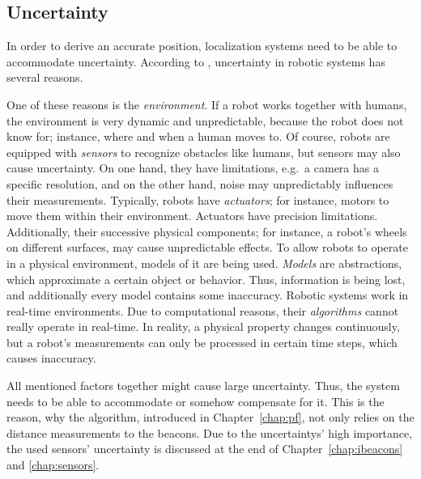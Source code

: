 \subsection{Uncertainty}
In order to derive an accurate position, localization systems need to be able to accommodate uncertainty. According to \citet{thrun:prob_robo}, uncertainty in robotic systems has several reasons.

One of these reasons is the \emph{environment}. If a robot works together with humans, the environment is very dynamic and unpredictable, because the robot does not know for; instance, where and when a human moves to.
Of course, robots are equipped with \emph{sensors} to recognize obstacles like humans, but sensors may also cause uncertainty. On one hand, they have limitations, e.g.\ a camera has a specific resolution, and on the other hand, noise may unpredictably influences their measurements. 
Typically, robots have \emph{actuators}; for instance, motors to move them within their environment. Actuators have precision limitations. Additionally, their successive physical components; for instance, a robot's wheels on different surfaces, may cause unpredictable effects.
To allow robots to operate in a physical environment, models of it are being used. \emph{Models} are abstractions, which approximate a certain object or behavior. Thus, information is being lost, and additionally every model contains some inaccuracy. Robotic systems work in real-time environments. Due to computational reasons, their \emph{algorithms} cannot really operate in real-time. In reality, a physical property changes continuously, but a robot's measurements can only be processed in certain time steps, which causes inaccuracy. 

All mentioned factors together might cause large uncertainty. Thus, the system needs to be able to accommodate or somehow compensate for it. This is the reason, why the algorithm, introduced in Chapter~\ref{chap:pf}, not only relies on the distance measurements to the beacons. Due to the uncertaintys' high importance, the used sensors' uncertainty is discussed at the end of Chapter~\ref{chap:ibeacons} and \ref{chap:sensors}.

